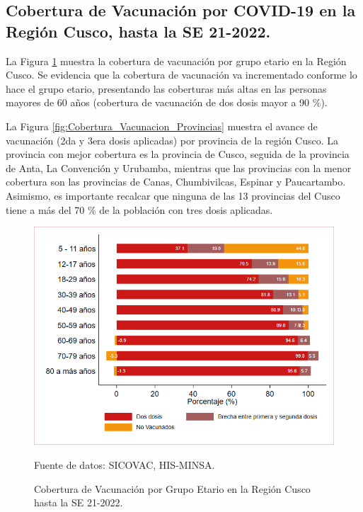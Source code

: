 \documentclass[12pt,a4paper,openany]{book}
\begin{document}
	\subsection*{Cobertura de Vacunación por COVID-19 en la Región Cusco, hasta la SE 21-2022.}
	\noindent La Figura \ref{fig:vacuna_edad} muestra la cobertura de vacunación por grupo etario en la Región Cusco. Se evidencia que la cobertura de vacunación va incrementado conforme lo hace el grupo etario, presentando las coberturas más altas en las personas mayores de 60 años (cobertura de vacunación de dos dosis mayor a 90 $\%$). 
	
	La Figura \ref{fig:Cobertura_Vacunacion_Provincias} muestra el avance de vacunación (2da y 3era dosis aplicadas) por provincia de la región Cusco. La provincia con mejor cobertura es la provincia de Cusco, seguida de la provincia de Anta, La Convención y Urubamba, mientras que las provincias con la menor cobertura son las provincias de Canas, Chumbivilcas, Espinar y Paucartambo. Asimismo, es importante recalcar que ninguna de las 13 provincias del Cusco tiene a más del 70 $\%$ de la población con tres dosis aplicadas. 
	\begin{figure}[h]
		\caption{Cobertura de Vacunación por Grupo Etario en la Región Cusco hasta la SE 21-2022. }\label{fig:vacuna_edad}
		\begin{center}
			\includegraphics[width=0.85\linewidth]{../figuras/vacunacion_grupo_edad.png}
		\end{center}
		{\footnotesize {Fuente de datos: SICOVAC, HIS-MINSA.}}
	\end{figure}
	\clearpage
	
\end{document}
